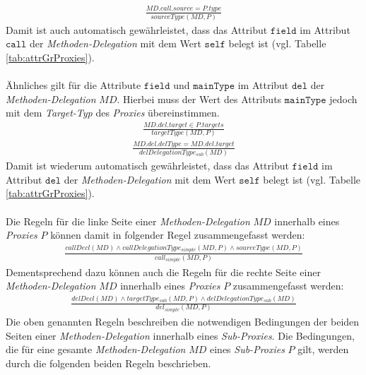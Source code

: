 \begin{gather*}
\frac{\mathit{MD.call.source} = \mathit{P.type}}
{\mathit{sourceType(MD, P)}}
\end{gather*}
\noindent
Damit ist auch automatisch gewährleistet, dass das Attribut $\texttt{field}$ im Attribut $\texttt{call}$ der \emph{Methoden-Delegation} mit dem Wert $\texttt{self}$ belegt ist (vgl. Tabelle \ref{tab:attrGrProxies}).
\\\\
Ähnliches gilt für die Attribute $\texttt{field}$ und $\texttt{mainType}$ im Attribut $\texttt{del}$ der \emph{Methoden-Delegation} $\mathit{MD}$. Hierbei muss der Wert des Attributs $\texttt{mainType}$ jedoch mit dem \emph{Target-Typ} des \emph{Proxies} übereinstimmen.
\begin{gather*}
\frac{\mathit{MD.del.target} \in \mathit{P.targets} }
{\mathit{targetType(MD, P)}}
\end{gather*}
\begin{gather*}
\frac{\mathit{MD.del.delType} = \mathit{MD.del.target} }
{\mathit{delDelegationType_{sub}(MD)}}
\end{gather*}
Damit ist wiederum automatisch gewährleistet, dass das Attribut $\texttt{field}$ im Attribut $\texttt{del}$ der \emph{Methoden-Delegation} mit dem Wert $\texttt{self}$ belegt ist (vgl. Tabelle \ref{tab:attrGrProxies}).
\\\\
Die Regeln für die linke Seite einer \emph{Methoden-Delegation} $\mathit{MD}$ innerhalb eines \emph{Proxies} $P$ können damit in folgender Regel zusammengefasst werden:
\begin{gather*}
\frac{\mathit{callDecl(MD)} \wedge \mathit{callDelegationType_{simple}(MD,P)} \wedge \mathit{sourceType(MD,P)}}
{\mathit{call_{simple}(MD,P)}}
\end{gather*}
Dementsprechend dazu können auch die Regeln für die rechte Seite einer \emph{Methoden-Delegation} $\mathit{MD}$ innerhalb eines \emph{Proxies} $P$ zusammengefasst werden:
\begin{gather*}
\frac{\mathit{delDecl(MD)} \wedge \mathit{targetType_{sub}(MD,P) \wedge \mathit{delDelegationType_{sub}(MD)}}}
{\mathit{del_{simple}(MD,P)}}
\end{gather*}
\noindent
Die oben genannten Regeln beschreiben die notwendigen Bedingungen der beiden Seiten einer \emph{Methoden-Delegation} innerhalb eines \emph{Sub-Proxies}. Die Bedingungen, die für eine gesamte \emph{Methoden-Delegation} $\mathit{MD}$ eines \emph{Sub-Proxies} $P$ gilt, werden durch die folgenden beiden Regeln beschrieben.
